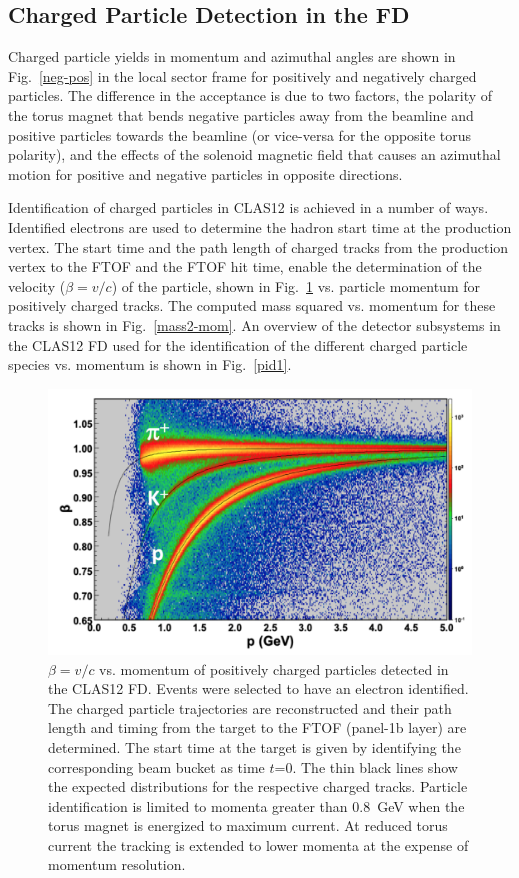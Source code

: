 \documentclass[final,3p,twocolumn]{elsarticle}
\begin{document}
\subsection{Charged Particle Detection in the FD}
 
Charged particle yields in momentum and azimuthal angles are shown in Fig.~\ref{neg-pos} in the local sector
frame for positively and negatively charged particles. The difference in the acceptance is due to two factors, the
polarity of the torus magnet that bends negative particles away from the beamline and positive particles towards
the beamline (or vice-versa for the opposite torus polarity), and the effects of the solenoid magnetic field that
causes an azimuthal motion for positive and negative particles in opposite directions. 

Identification of charged particles in CLAS12 is achieved in a number of ways. Identified electrons are used
to determine the hadron start time at the production vertex. The start time and the path length of charged
tracks from the production vertex to the FTOF and the FTOF hit time, enable the determination of the
velocity ($\beta = v/c$) of the particle, shown in Fig.~\ref{pid} vs. particle momentum for positively charged
tracks. The computed mass squared vs. momentum for these tracks is shown in Fig.~\ref{mass2-mom}. An
overview of the detector subsystems in the CLAS12 FD used for the identification of the different charged
particle species vs. momentum is shown in Fig.~\ref{pid1}. 

\begin{figure}[ht!]
\centerline{\includegraphics[width=1.0\columnwidth]{FTOF1b_pid.png}}
\caption{$\beta = v/c $ vs. momentum of positively charged particles detected in the CLAS12 FD. Events were selected
  to have an electron identified. The charged particle trajectories are reconstructed and their path length and timing
  from the target to the FTOF (panel-1b layer) are determined. The start time at the target is given by identifying the
  corresponding beam bucket as time $t$=0. The thin black lines show the expected distributions for the respective
  charged tracks. Particle identification is limited to momenta greater than 0.8~GeV when the torus magnet is energized
  to maximum current. At reduced torus current the tracking is extended to lower momenta at the expense of momentum
  resolution.}
\label{pid}
\end{figure} 
\end{document}
